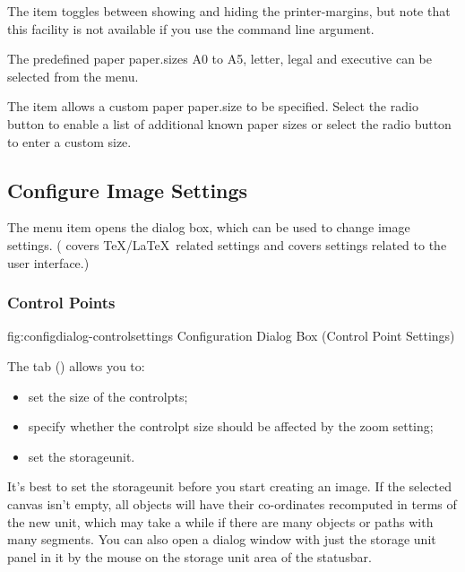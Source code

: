 The  item toggles between showing
and hiding the \glspl{printer-margin}, but note that this facility is not
available if you use the  command line
argument.

The predefined paper \glspl{paper.size} A0 to A5, letter, legal and executive
can be selected from the  menu.


The  item allows a custom paper \gls{paper.size} to
be specified.  Select the   radio button to
enable a list of additional known paper sizes or select the
 radio button to enter a custom size.


\subsection{Configure Image Settings}\label{sec:configuredialog}


The  menu item opens the 
dialog box, which can be used to change image settings.
( covers \TeX\slash\LaTeX\ related settings and
 covers settings related to the user
interface.)


\subsubsection{Control Points}\label{sec:controlsettings}


\FloatFig
  {fig:configdialog-controlsettings}
  {}
  {Configuration Dialog Box (Control Point Settings)}

The  tab
()
allows you to:
\begin{itemize}
 \item set the size of the \glspl{controlpt};
 \item specify whether the \gls{controlpt} size should be affected by
the zoom setting;
 \item set the \gls{storageunit}.
\end{itemize}

It's best to set the \gls{storageunit} before you start creating an
image. If the selected \gls{canvas} isn't empty, all \glspl{object} will
have their co-ordinates recomputed in terms of the new unit, which
may take a while if there are many \glspl{object} or \glspl{path}
with many segments.  You can also open a dialog window with just the
storage unit panel in it by 
the mouse on the storage unit area of the \gls{statusbar}.


